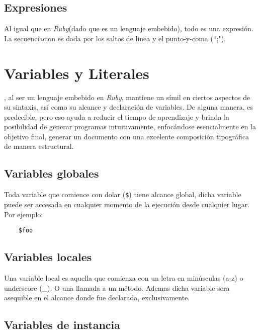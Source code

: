 \documentclass[12pt,letterpaper,titlepage,oneside,openright]{book}
\newcommand{\OhTeX}{%
    \makebox[0.76em][c]{O}%
    \makebox[0.25em][c]{%
        \raisebox{0.14em}[0em][0em]{%
            \fontsize{0.5em}{0cm}%
                \selectfont H%
        }%
    }%
    \makebox[1.35em][c]{\TeX}%
}
\newcommand{\ohtex}{\OhTeX\xspace}
\newcommand{\ruby}{\textit{Ruby}\xspace}
\newcommand{\ttcode}[1]{(\texttt{#1})}
\begin{document}
\subsection{Expresiones}

Al igual que en \ruby (dado que es un lenguaje embebido), todo es una expresión.
La secuenciacion es dada por los saltos de linea y el punto-y-coma (``;").

\section{Variables y Literales}

\ohtex, al ser un lenguaje embebido en \ruby, mantiene un símil en ciertos
aspectos de su sintaxis, así como su alcance y declaración de variables. De
alguna manera, es predecible, pero eso ayuda a reducir el tiempo de aprendizaje
y brinda la posibilidad de generar programas intuitivamente, enfocándose
esencialmente en la objetivo final, generar un documento con una excelente
composición tipográfica de manera estructural.

\subsection{Variables globales}

Toda variable que comience con dolar \ttcode{\$} tiene alcance global, dicha
variable puede ser accesada en cualquier momento de la ejecución desde cualquier
lugar. Por ejemplo:

\begin{center}
\begin{lstlisting}
    $foo
\end{lstlisting}
\end{center}

\subsection{Variables locales}

Una variable local es aquella que comienza con un letra en minúsculas (a-z) o
underscore (\_). O una llamada a un método. Ademas dicha variable sera asequible
en el alcance donde fue declarada, exclusivamente.

\subsection{Variables de instancia}

\end{document}
